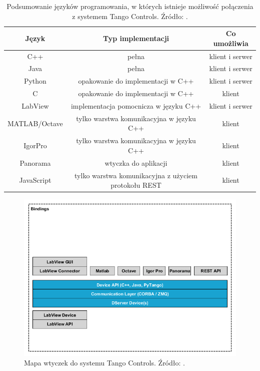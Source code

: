 \begin{table}[hpt]
    \centering
    \begin{tabular}{|c|c|c|}
        \hline 
        \textbf{Język} & \textbf{Typ implementacji} &\textbf{Co umożliwia} \\ 
        \hline 
        C++ & pełna & klient i serwer \\ 
        \hline 
        Java & pełna & klient i serwer \\ 
        \hline 
        Python & opakowanie do implementacji w C++ & klient i serwer \\ 
        \hline 
        C & opakowanie do implementacji w C++ & klient \\ 
        \hline 
        LabView & implementacja pomocnicza w języku C++ & klient i serwer \\ 
        \hline 
        MATLAB/Octave & tylko warstwa komunikacyjna w języku C++ & klient \\ 
        \hline 
        IgorPro & tylko warstwa komunikacyjna w języku C++ & klient \\ 
        \hline 
        Panorama & wtyczka do aplikacji & klient \\ 
        \hline 
        JavaScript & tylko warstwa komunikacyjna z użyciem protokołu REST & klient \\ 
        \hline 
    \end{tabular}
    \caption{Podsumowanie języków programowania, w których istnieje możliwość połączenia z systemem Tango Controls. Źródło: \cite{TangoWebsite}.}
    \label{tab:tango-implementations}
\end{table}

\begin{figure}[htp]
    \centering
    \includegraphics[width=\textwidth]{Grafika/tango_bindings_map1_1}
    \caption{Mapa wtyczek do systemu Tango Controls. Źródło: \cite{TangoDocs}.}\label{fig:tango-bindings}
\end{figure}

